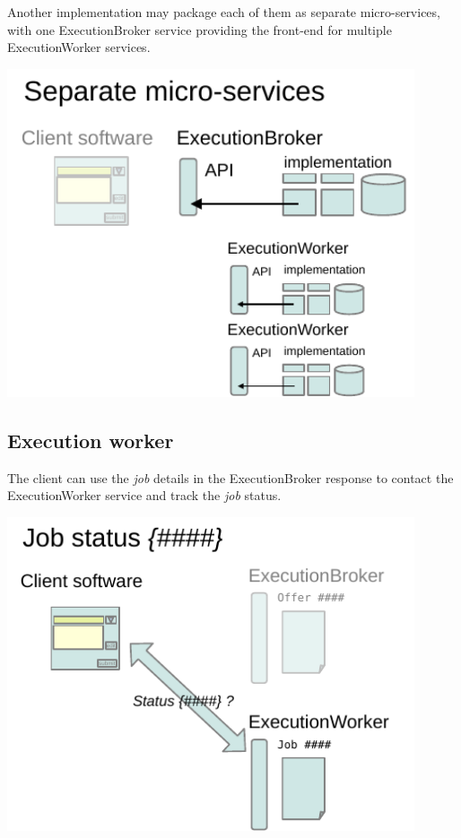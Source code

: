 \documentclass[11pt,a4paper]{ivoa}
\newcommand{\execbrokerclass} {ExecutionBroker}
\newcommand{\execworkerclass} {ExecutionWorker}
\newcommand{\workerjob} {\textit{job}}
\begin{document}
Another implementation may package each of them as separate micro-services, with one \execbrokerclass{}
service providing the front-end for multiple \execworkerclass{} services.

\includegraphics[width=0.9\textwidth]{diagrams/micro-services.pdf}

\subsection{Execution worker}
\label{execution-worker-desc}

The client can use the \workerjob{} details in the \execbrokerclass{} response to contact
the \execworkerclass{} service and track the \workerjob{} status.

\includegraphics[width=0.9\textwidth]{diagrams/job-status.pdf}
\end{document}

